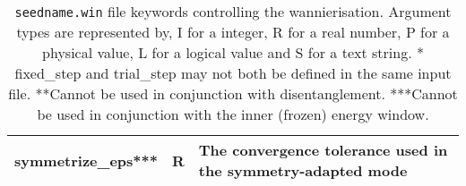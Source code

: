 \begin{table}
\begin{center}
\begin{tabular}{|c|c|p{6cm}|}
{\sc  symmetrize\_eps}***   & R &  The convergence tolerance used in the symmetry-adapted mode \\ 
\hline
\end{tabular}
\caption[Parameter file keywords controlling the Wannierise routine.]
{{\tt seedname.win} file keywords controlling the wannierisation.
  Argument types 
are represented by, I for a integer, R for a real number, P for a
physical value, L for a logical value and S for a text string. 
{\footnotesize
* {\sc fixed\_step } and  {\sc trial\_step } may not both be defined in
the same input file. **Cannot be used in conjunction with disentanglement.
***Cannot be used in conjunction with the inner (frozen) energy window.}}
\label{parameter_keywords5}
\end{center}
\end{table}



